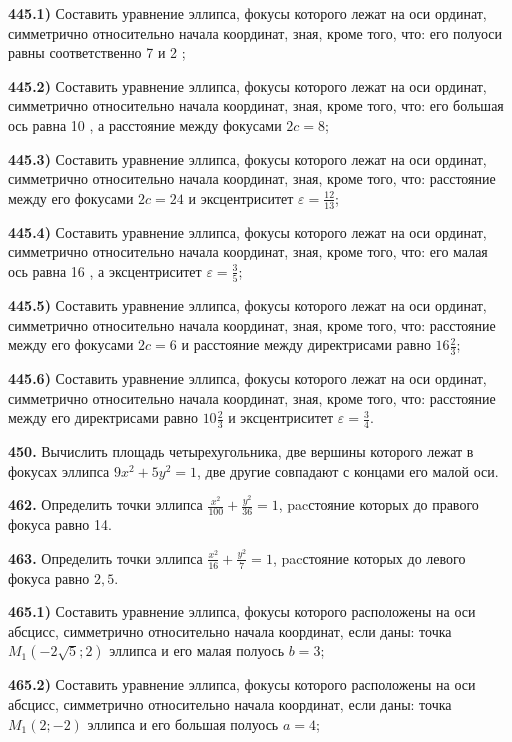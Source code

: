 \textbf{445.1)} Составить уравнение эллипса, фокусы которого лежат на оси ординат, симметрично относительно начала координат, зная, кроме того, что: его полуоси равны соответственно 7 и 2 ;

\textbf{445.2)} Составить уравнение эллипса, фокусы которого лежат на оси ординат, симметрично относительно начала координат, зная, кроме того, что: его большая ось равна 10 , а расстояние между фокусами $2 c=8$;

\textbf{445.3)} Составить уравнение эллипса, фокусы которого лежат на оси ординат, симметрично относительно начала координат, зная, кроме того, что: расстояние между его фокусами $2 c=24$ и эксцентриситет $\varepsilon=\frac{12}{13}$;

\textbf{445.4)} Составить уравнение эллипса, фокусы которого лежат на оси ординат, симметрично относительно начала координат, зная, кроме того, что: его малая ось равна 16 , а эксцентриситет $\varepsilon=\frac{3}{5}$;

\textbf{445.5)} Составить уравнение эллипса, фокусы которого лежат на оси ординат, симметрично относительно начала координат, зная, кроме того, что: расстояние между его фокусами $2 c=6$ и расстояние между директрисами равно $16 \frac{2}{3}$;

\textbf{445.6)} Составить уравнение эллипса, фокусы которого лежат на оси ординат, симметрично относительно начала координат, зная, кроме того, что: расстояние между его директрисами равно $10 \frac{2}{3}$ и эксцентриситет $\varepsilon=\frac{3}{4}$.

\textbf{450.} Вычислить площадь четырехугольника, две вершины которого лежат в фокусах эллипса $9 x^2+5 y^2=1$, две другие совпадают с концами его малой оси.

\textbf{462.} Определить точки эллипса $\frac{x^2}{100}+\frac{y^2}{36}=1$, pacстояние которых до правого фокуса равно 14.

\textbf{463.} Определить точки эллипса $\frac{x^2}{16}+\frac{y^2}{7}=1$, pacстояние которых до левого фокуса равно $2,5$.

\textbf{465.1)} Составить уравнение эллипса, фокусы которого расположены на оси абсцисс, симметрично относительно начала координат, если даны: точка $M_1(-2 \sqrt{5} ; 2)$ эллипса и его малая полуось $b=3$;

\textbf{465.2)} Составить уравнение эллипса, фокусы которого расположены на оси абсцисс, симметрично относительно начала координат, если даны: точка $M_1(2 ;-2)$ эллипса и его большая полуось $a=4$;

